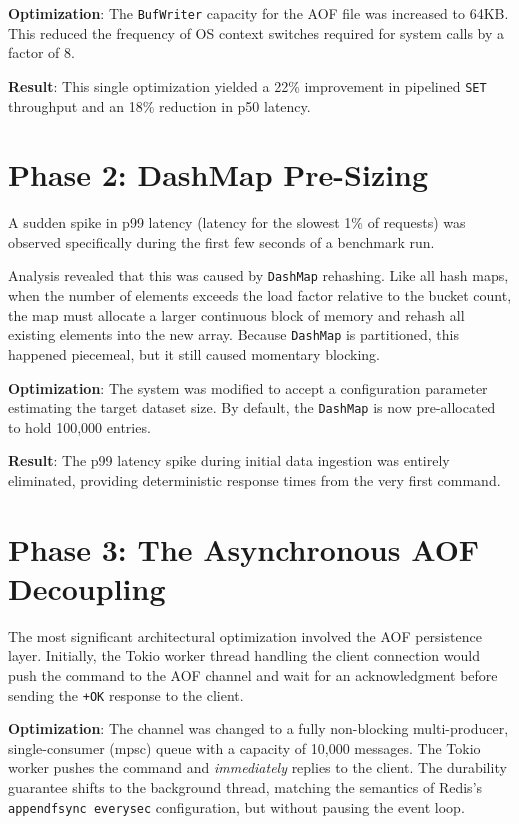 \textbf{Optimization}: The \texttt{BufWriter} capacity for the AOF file was increased to 64KB. This reduced the frequency of OS context switches required for system calls by a factor of 8. 

\textbf{Result}: This single optimization yielded a 22\% improvement in pipelined \texttt{SET} throughput and an 18\% reduction in p50 latency.

\section{Phase 2: DashMap Pre-Sizing}

A sudden spike in p99 latency (latency for the slowest 1\% of requests) was observed specifically during the first few seconds of a benchmark run. 

Analysis revealed that this was caused by \texttt{DashMap} rehashing. Like all hash maps, when the number of elements exceeds the load factor relative to the bucket count, the map must allocate a larger continuous block of memory and rehash all existing elements into the new array. Because \texttt{DashMap} is partitioned, this happened piecemeal, but it still caused momentary blocking.

\textbf{Optimization}: The system was modified to accept a configuration parameter estimating the target dataset size. By default, the \texttt{DashMap} is now pre-allocated to hold 100,000 entries. 

\textbf{Result}: The p99 latency spike during initial data ingestion was entirely eliminated, providing deterministic response times from the very first command.

\section{Phase 3: The Asynchronous AOF Decoupling}

The most significant architectural optimization involved the AOF persistence layer. Initially, the Tokio worker thread handling the client connection would push the command to the AOF channel and wait for an acknowledgment before sending the \texttt{+OK} response to the client.

\textbf{Optimization}: The channel was changed to a fully non-blocking multi-producer, single-consumer (mpsc) queue with a capacity of 10,000 messages. The Tokio worker pushes the command and \textit{immediately} replies to the client. The durability guarantee shifts to the background thread, matching the semantics of Redis's \texttt{appendfsync everysec} configuration, but without pausing the event loop.

